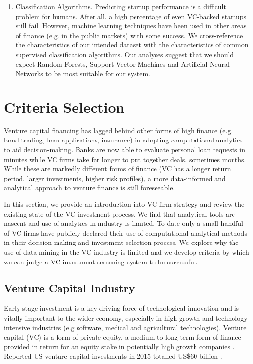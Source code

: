 \documentclass[../thesis/thesis.tex]{subfiles}
\begin{document}
\begin{refsection}
\begin{enumerate}
\item Classification Algorithms. Predicting startup performance is a difficult problem for humans. After all, a high percentage of even VC-backed startups still fail. However, machine learning techniques have been used in other areas of finance (e.g. in the public markets) with some success. We cross-reference the characteristics of our intended dataset with the characteristics of common supervised classification algorithms. Our analyses suggest that we should expect Random Forests, Support Vector Machines and Artificial Neural Networks to be most suitable for our system.

\end{enumerate}

\section{Criteria Selection}

Venture capital financing has lagged behind other forms of high finance (e.g. bond trading, loan applications, insurance) in adopting computational analytics to aid decision-making. Banks are now able to evaluate personal loan requests in minutes while VC firms take far longer to put together deals, sometimes months. While these are markedly different forms of finance (VC has a longer return period, larger investments, higher risk profiles), a more data-informed and analytical approach to venture finance is still foreseeable.

In this section, we provide an introduction into VC firm strategy and review the existing state of the VC investment process. We find that analytical tools are nascent and use of analytics in industry is limited. To date only a small handful of VC firms have publicly declared their use of computational analytical methods in their decision making and investment selection process. We explore why the use of data mining in the VC industry is limited and we develop criteria by which we can judge a VC investment screening system to be successful.

\subsection{Venture Capital Industry}

Early-stage investment is a key driving force of technological innovation and is vitally important to the wider economy, especially in high-growth and technology intensive industries (e.g software, medical and agricultural technologies). Venture capital (VC) is a form of private equity, a medium to long-term form of finance provided in return for an equity stake in potentially high growth companies \cite{nvca2016}. Reported US venture capital investments in 2015 totalled US\$60 billion \cite{nvca2016}.


\end{refsection}
\end{document}
